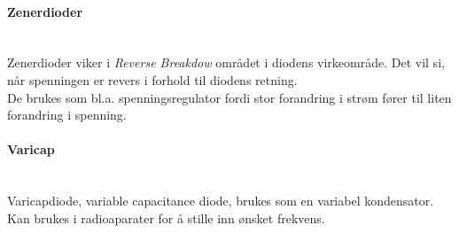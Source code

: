 \paragraph{Zenerdioder} \mbox{} \\
Zenerdioder viker i \emph{Reverse Breakdow} området i diodens virkeområde.
Det vil si, når spenningen er revers i forhold til diodens retning.
\\
De brukes som bl.a. spenningsregulator fordi
stor forandring i strøm fører til liten forandring i spenning.

\paragraph{Varicap} \mbox{} \\
Varicapdiode, variable capacitance diode,
brukes som en variabel kondensator.
Kan brukes i radioaparater for å stille inn ønsket frekvens.
